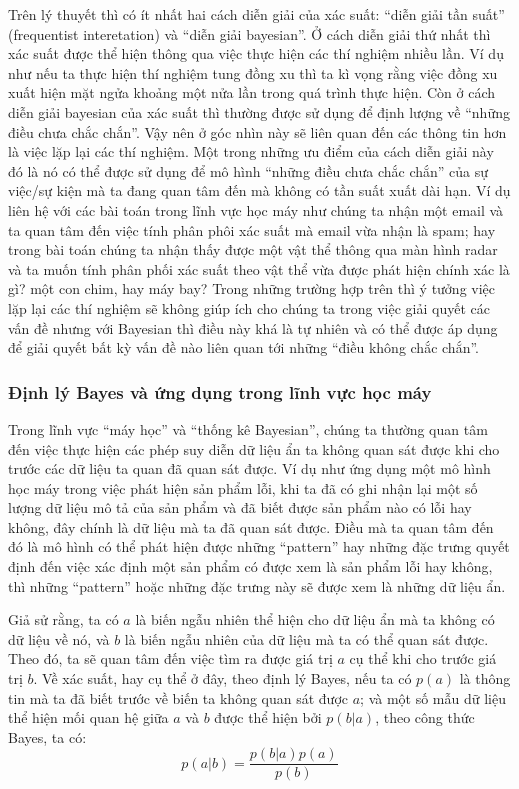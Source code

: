         
        Trên lý thuyết thì có ít nhất hai cách diễn giải của xác suất: ``diễn giải tần suất'' (frequentist interetation) và ``diễn giải bayesian''. Ở cách diễn giải thứ nhất thì xác suất được thể hiện thông qua việc thực hiện các thí nghiệm nhiều lần. Ví dụ như nếu ta thực hiện thí nghiệm tung đồng xu thì ta kì vọng rằng việc đồng xu xuất hiện mặt ngửa khoảng một nửa lần trong quá trình thực hiện. Còn ở cách diễn giải bayesian của xác suất thì thường được sử dụng để định lượng về ``những điều chưa chắc chắn''. Vậy nên ở góc nhìn này sẽ liên quan đến các thông tin hơn là việc lặp lại các thí nghiệm. Một trong những ưu điểm của cách diễn giải này đó là nó có thể được sử dụng để mô hình ``những điều chưa chắc chắn'' của sự việc/sự kiện mà ta đang quan tâm đến mà không có tần suất xuất dài hạn. Ví dụ liên hệ với các bài toán trong lĩnh vực học máy như chúng ta nhận một email và ta quan tâm đến việc tính phân phôi xác suất mà email vừa nhận là spam; hay trong bài toán chúng ta nhận thấy được một vật thể thông qua màn hình radar và ta muốn tính phân phối xác suất theo vật thể vừa được phát hiện chính xác là gì? một con chim, hay máy bay? Trong những trường hợp trên thì ý tưởng việc lặp lại các thí nghiệm sẽ không giúp ích cho chúng ta trong việc giải quyết các vấn đề nhưng với Bayesian thì điều này khá là tự nhiên và có thể được áp dụng để giải quyết bất kỳ vấn đề nào liên quan tới những ``điều không chắc chắn''.
        
        \subsubsection{Định lý Bayes và ứng dụng trong lĩnh vực học máy}
        Trong lĩnh vực ``máy học'' và ``thống kê Bayesian'', chúng ta thường quan tâm đến việc thực hiện các phép suy diễn dữ liệu ẩn ta không quan sát được khi cho trước các dữ liệu ta quan đã quan sát được.
        Ví dụ như ứng dụng một mô hình học máy trong việc phát hiện sản phẩm lỗi, khi ta đã có ghi nhận lại một số lượng dữ liệu mô tả của sản phẩm và đã biết được sản phẩm nào có lỗi hay không, đây chính là dữ liệu mà ta đã quan sát được. Điều mà ta quan tâm đến đó là mô hình có thể phát hiện được những ``pattern'' hay những đặc trưng quyết định đến việc xác định một sản phẩm có được xem là sản phẩm lỗi hay không, thì những ``pattern'' hoặc những đặc trưng này sẽ được xem là những dữ liệu ẩn.

        Giả sử rằng, ta có $a$ là biến ngẫu nhiên thể hiện cho dữ liệu ẩn mà ta không có dữ liệu về nó, và $b$ là biến ngẫu nhiên của dữ liệu mà ta có thể quan sát được.
        Theo đó, ta sẽ quan tâm đến việc tìm ra được giá trị $a$ cụ thể khi cho trước giá trị $b$. 
        Về xác suất, hay cụ thể ở đây, theo định lý Bayes, nếu ta có $p(a)$ là thông tin mà ta đã biết trước về biến ta không quan sát được $a$; và một số mẫu dữ liệu thể hiện mối quan hệ giữa $a$ và $b$ được thể hiện bởi $p(b|a)$, theo công thức Bayes, ta có:
        \begin{equation}
            \label{equal_bayes}
            p(a|b) = \frac{p(b|a)p(a)}{p(b)}
        \end{equation}

